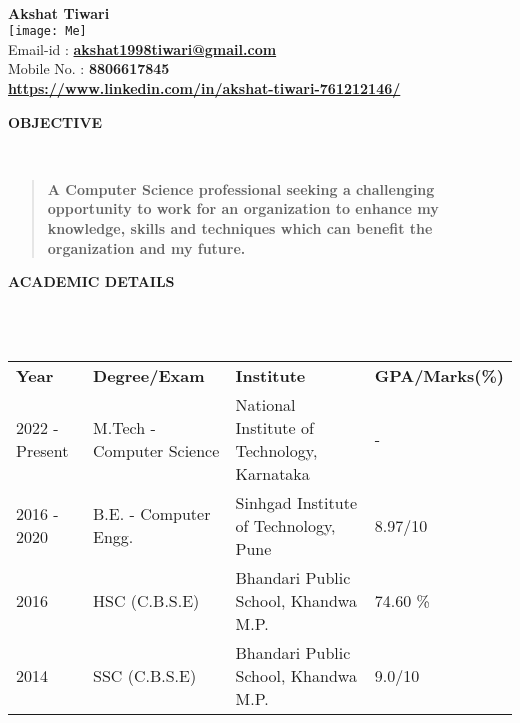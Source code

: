 \documentclass[a4paper,10pt]{article}
\newcommand{\lsep}{-0.4cm}
\newcommand{\resheading}[1]{{\small \colorbox{mygrey}{\begin{minipage}{0.975\textwidth}{\textbf{#1 \vphantom{p\^{E}}}}\end{minipage}}}}
\begin{document}
	\hspace{0.5cm}\\[-0.2cm]
	
	\textbf{\Large{Akshat Tiwari}} \\
	\indent\texttt{[image: Me]} \\
	\indent Email-id : \textbf{\url{akshat1998tiwari@gmail.com}} \\
	\indent Mobile No. : \textbf{8806617845} \ \\
	\indent \textbf{\url{https://www.linkedin.com/in/akshat-tiwari-761212146/}}\\
	
	\vspace{35pt}
	
	\resheading{\textbf{OBJECTIVE} }\\[\lsep]
	\begin{quote}
		\setlength\itemsep{0.5em}
		\textbf{ A Computer Science professional seeking a challenging opportunity to work for an organization to enhance my knowledge, skills and techniques which can benefit the organization and my future. }
	\end{quote}

	\vspace{8pt}
	
	\resheading{\textbf{ACADEMIC DETAILS} }\\[\lsep]
	\\
	
	
	\indent \begin{tabular}{ l @{\hskip 0.15in} l @{\hskip 0.15in} l @{\hskip 0.15in} l @{\hskip 0.15in} }
		\noindent \textbf{Year} & \textbf{Degree/Exam} & \textbf{Institute} & \textbf{GPA/Marks(\%)}\\
		2022 - Present & M.Tech - Computer Science & National Institute of Technology, Karnataka& - \\
		2016 - 2020 & B.E. - Computer Engg. & Sinhgad Institute of Technology, Pune & 8.97/10  \\
		2016 & HSC (C.B.S.E) & Bhandari Public School, Khandwa M.P. & 74.60 \% \\
		2014 & SSC (C.B.S.E) & Bhandari Public School, Khandwa M.P. & 9.0/10 \\
		
	\end{tabular}
	\\
	
\end{document}

